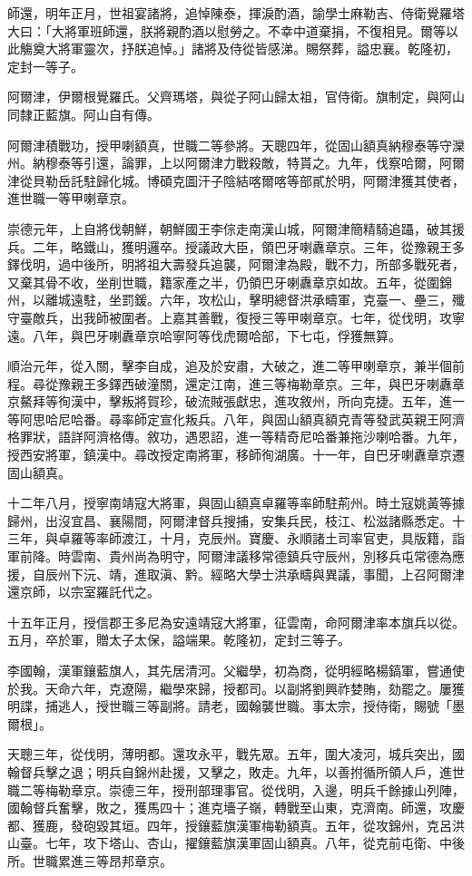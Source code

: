 \begin{pinyinscope}
師還，明年正月，世祖宴諸將，追悼陳泰，揮淚酌酒，諭學士麻勒吉、侍衛覺羅塔大曰：「大將軍班師還，朕將親酌酒以慰勞之。不幸中道棄捐，不復相見。爾等以此觴奠大將軍靈次，抒朕追悼。」諸將及侍從皆感涕。賜祭葬，謚忠襄。乾隆初，定封一等子。

阿爾津，伊爾根覺羅氏。父齊瑪塔，與從子阿山歸太祖，官侍衛。旗制定，與阿山同隸正藍旗。阿山自有傳。

阿爾津積戰功，授甲喇額真，世職二等參將。天聰四年，從固山額真納穆泰等守灤州。納穆泰等引還，論罪，上以阿爾津力戰殺敵，特貰之。九年，伐察哈爾，阿爾津從貝勒岳託駐歸化城。博碩克圖汗子陰結喀爾喀等部貳於明，阿爾津獲其使者，進世職一等甲喇章京。

崇德元年，上自將伐朝鮮，朝鮮國王李倧走南漢山城，阿爾津簡精騎追躡，破其援兵。二年，略鐵山，獲明邏卒。授議政大臣，領巴牙喇纛章京。三年，從豫親王多鐸伐明，過中後所，明將祖大壽發兵追襲，阿爾津為殿，戰不力，所部多戰死者，又棄其骨不收，坐削世職，籍家產之半，仍領巴牙喇纛章京如故。五年，從圍錦州，以離城遠駐，坐罰鍰。六年，攻松山，擊明總督洪承疇軍，克臺一、壘三，殲守臺敵兵，出我師被圍者。上嘉其善戰，復授三等甲喇章京。七年，從伐明，攻寧遠。八年，與巴牙喇纛章京哈寧阿等伐虎爾哈部，下七屯，俘獲無算。

順治元年，從入關，擊李自成，追及於安肅，大破之，進二等甲喇章京，兼半個前程。尋從豫親王多鐸西破潼關，還定江南，進三等梅勒章京。三年，與巴牙喇纛章京鰲拜等徇漢中，擊叛將賀珍，破流賊張獻忠，進攻敘州，所向克捷。五年，進一等阿思哈尼哈番。尋率師定宣化叛兵。八年，與固山額真額克青等發武英親王阿濟格罪狀，語詳阿濟格傳。敘功，遇恩詔，進一等精奇尼哈番兼拖沙喇哈番。九年，授西安將軍，鎮漢中。尋改授定南將軍，移師徇湖廣。十一年，自巴牙喇纛章京遷固山額真。

十二年八月，授寧南靖寇大將軍，與固山額真卓羅等率師駐荊州。時土寇姚黃等據歸州，出沒宜昌、襄陽間，阿爾津督兵搜捕，安集兵民，枝江、松滋諸縣悉定。十三年，與卓羅等率師渡江，十月，克辰州。寶慶、永順諸土司率官吏，具版籍，詣軍前降。時雲南、貴州尚為明守，阿爾津議移常德鎮兵守辰州，別移兵屯常德為應援，自辰州下沅、靖，進取滇、黔。經略大學士洪承疇與異議，事聞，上召阿爾津還京師，以宗室羅託代之。

十五年正月，授信郡王多尼為安遠靖寇大將軍，征雲南，命阿爾津率本旗兵以從。五月，卒於軍，贈太子太保，謚端果。乾隆初，定封三等子。

李國翰，漢軍鑲藍旗人，其先居清河。父繼學，初為商，從明經略楊鎬軍，嘗通使於我。天命六年，克遼陽，繼學來歸，授都司。以副將劉興祚婪賄，劾罷之。屢獲明諜，捕逃人，授世職三等副將。請老，國翰襲世職。事太宗，授侍衛，賜號「墨爾根」。

天聰三年，從伐明，薄明都。還攻永平，戰先眾。五年，圍大凌河，城兵突出，國翰督兵擊之退；明兵自錦州赴援，又擊之，敗走。九年，以善拊循所領人戶，進世職二等梅勒章京。崇德三年，授刑部理事官。從伐明，入邊，明兵千餘據山列陣，國翰督兵奮擊，敗之，獲馬四十；進克墻子嶺，轉戰至山東，克濟南。師還，攻慶都、獲鹿，發砲毀其垣。四年，授鑲藍旗漢軍梅勒額真。五年，從攻錦州，克呂洪山臺。七年，攻下塔山、杏山，擢鑲藍旗漢軍固山額真。八年，從克前屯衛、中後所。世職累進三等昂邦章京。


\end{pinyinscope}
